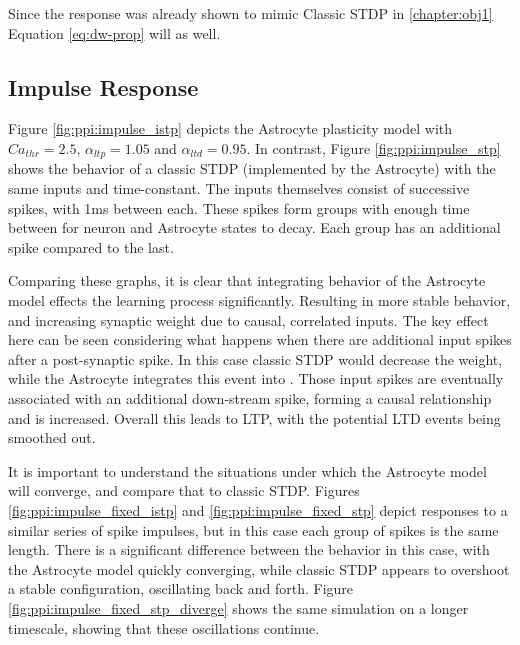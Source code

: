 Since the \ca response was already shown to mimic Classic STDP in \ref{chapter:obj1}
Equation \ref{eq:dw-prop} will as well.

\subsection{Impulse Response}
Figure \ref{fig:ppi:impulse_istp} depicts the Astrocyte plasticity model with
$Ca_{thr}=2.5$, $\alpha_{ltp}=1.05$ and $\alpha_{ltd}=0.95$. In contrast, Figure
\ref{fig:ppi:impulse_stp} shows the behavior of a classic STDP (implemented by
the Astrocyte) with the same inputs and time-constant. The inputs themselves
consist of successive spikes, with 1ms between each. These spikes form groups
with enough time between for neuron and Astrocyte states to decay. Each group
has an additional spike compared to the last.

Comparing these graphs, it is clear that integrating
behavior of the Astrocyte model effects the learning process
significantly. Resulting in more stable behavior, and increasing synaptic weight
due to causal, correlated inputs. The key effect here can be seen considering
what happens when there are additional input spikes after a post-synaptic
spike. In this case classic STDP would decrease the weight, while the Astrocyte
integrates this event into \ca. Those input spikes are eventually associated
with an additional down-stream spike, forming a causal relationship and \ca is
increased. Overall this leads to LTP, with the potential LTD events being
smoothed out.



It is important to understand the situations under which the Astrocyte model
will converge, and compare that to classic STDP. Figures
\ref{fig:ppi:impulse_fixed_istp} and \ref{fig:ppi:impulse_fixed_stp} depict
responses to a similar series of spike impulses, but in this case each group of
spikes is the same length. There is a significant difference between the
behavior in this case, with the Astrocyte model quickly converging, while
classic STDP appears to overshoot a stable configuration, oscillating back and
forth. Figure \ref{fig:ppi:impulse_fixed_stp_diverge} shows the same simulation
on a longer timescale, showing that these oscillations continue.

